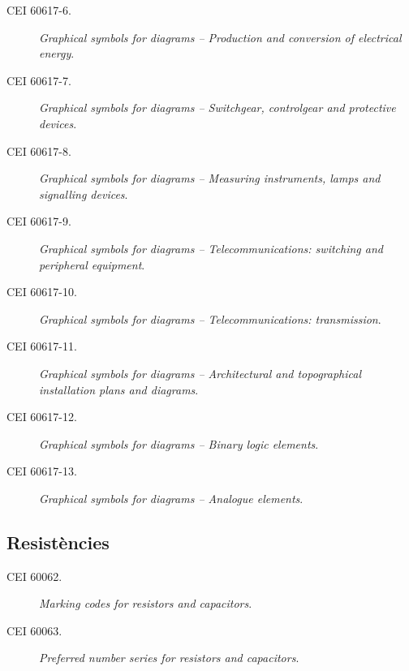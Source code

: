 \begin{description}
    \item [\hspace{5mm}CEI 60617-6.] \textit{Graphical symbols for diagrams -- Production and conversion of electrical energy}.
    \item [\hspace{5mm}CEI 60617-7.] \textit{Graphical symbols for diagrams -- Switchgear, controlgear and protective devices}.
     \item [\hspace{5mm}CEI 60617-8.] \textit{Graphical symbols for diagrams -- Measuring instruments, lamps and signalling devices}.
     \item [\hspace{5mm}CEI 60617-9.] \textit{Graphical symbols for diagrams -- Telecommunications: switching and peripheral equipment}.
      \item [\hspace{5mm}CEI 60617-10.] \textit{Graphical symbols for diagrams -- Telecommunications: transmission}.
      \item [\hspace{5mm}CEI 60617-11.] \textit{Graphical symbols for diagrams -- Architectural and topographical installation plans and diagrams}.
      \item [\hspace{5mm}CEI 60617-12.] \textit{Graphical symbols for diagrams -- Binary logic elements}.
      \item [\hspace{5mm}CEI 60617-13.] \textit{Graphical symbols for diagrams -- Analogue elements}.
\end{description}

\subsection*{Resistències} 
\begin{description}
	\item [\hspace{5mm}CEI 60062.] \textit{Marking codes for resistors and capacitors}.	
	\item [\hspace{5mm}CEI 60063.] \textit{Preferred number series for resistors and capacitors}.
\end{description}

